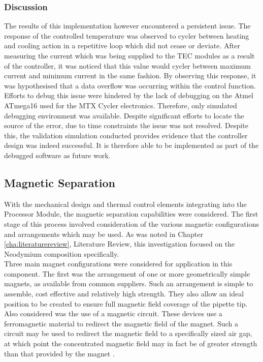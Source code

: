 \subsubsection{Discussion}

The results of this implementation however encountered a persistent issue. The response of the controlled temperature was observed to cycler between heating and cooling action in a repetitive loop which did not cease or deviate. After measuring the current which was being supplied to the TEC modules as a result of the controller, it was noticed that this value would cycler between maximum current and minimum current in the same fashion. By observing this response, it was hypothesised that a data overflow was occurring within the control function. Efforts to debug this issue were hindered by the lack of debugging on the Atmel ATmega16 used for the MTX Cycler electronics. Therefore, only  simulated debugging environment was available. Despite significant efforts to locate the source of the error, due to time constraints the issue was not resolved. Despite this, the validation simulation conducted provides evidence that the controller design was indeed successful. It is therefore able to be implemented as part of the debugged software as future work.

\subsection{Magnetic Separation}
\label{magsep}

With the mechanical design and thermal control elements integrating into the Processor Module, the magnetic separation capabilities were considered. The first stage of this process involved consideration of the various magnetic configurations and arrangements which may be used. As was noted in Chapter \ref{cha:literaturereview}, Literature Review, this investigation focused on the Neodymium composition specifically.\\

Three main magnet configurations were considered for application in this component. The first was the arrangement of one or more geometrically simple magnets, as available from common suppliers. Such an arrangement is simple to assemble, cost effective and relatively high strength. They also allow an ideal position to be created to ensure full magnetic field coverage of the pipette tip.\\

Also considered was the use of a magnetic circuit. These devices use a ferromagnetic material to redirect the magnetic field of the magnet. Such a circuit may be used to redirect the magnetic field to a specifically sized air gap, at which point the concentrated magnetic field may in fact be of greater strength than that provided by the magnet \cite{magcirc}.\\

